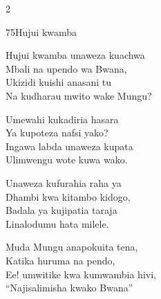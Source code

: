 \begin{multicols}{2}
\begin{hymn}{75}{Hujui kwamba}{}
\begin{stanza}
Hujui kwamba unaweza kuachwa\\
Mbali na upendo wa Bwana,\\
Ukizidi kuishi anasani tu\\
Na kudharau mwito wake Mungu?
\end{stanza}
\begin{chorus}
Umewahi kukadiria hasara\\
Ya kupoteza nafsi yako?\\
Ingawa labda unaweza kupata\\
Ulimwengu wote kuwa wako.
\end{chorus}
\begin{stanza}
Unaweza kufurahia raha ya\\
Dhambi kwa kitambo kidogo,\\
Badala ya kujipatia taraja\\
Linalodumu hata milele.
\end{stanza}
\begin{stanza}
Muda Mungu anapokuita tena,\\
Katika huruma na pendo,\\
Ee! umwitike kwa kumwambia hivi,\\
``Najisalimisha kwako Bwana''
\end{stanza}
\end{hymn}


\end{multicols}
